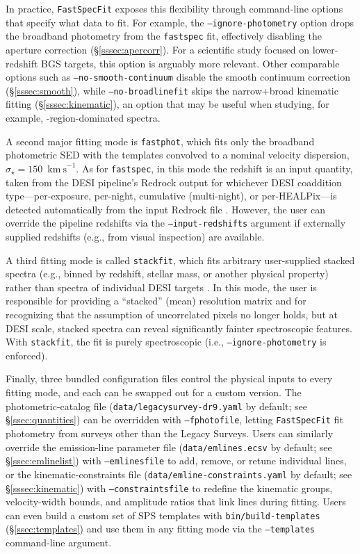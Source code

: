 \documentclass[modern,linenumbers]{aastex702}
\newcommand{\fastspecfit}{\texttt{FastSpecFit}}
\newcommand{\fastspec}{\texttt{fastspec}}
\newcommand{\fastphot}{\texttt{fastphot}}
\newcommand{\kms}{\ensuremath{\mathrm{km~s}^{-1}}}
\newcommand{\hii}{\ion{H}{2}}
\newcommand{\vdisp}{\ensuremath{\sigma_\star}}
\begin{document}
In practice, \fastspecfit{} exposes this flexibility through
command-line options that specify what data to fit. For example, the
\texttt{--ignore-photometry} option drops the broadband photometry
from the \fastspec{} fit, effectively disabling the aperture
correction (\S\ref{sssec:apercorr}). For a scientific study focused on
lower-redshift BGS targets, this option is arguably more relevant.
Other comparable options such as \texttt{--no-smooth-continuum}
disable the smooth continuum correction (\S\ref{sssec:smooth}), while
\texttt{--no-broadlinefit} skips the narrow+broad kinematic fitting
(\S\ref{sssec:kinematic}), an option that may be useful when studying,
for example, \hii-region-dominated spectra.

A second major fitting mode is \fastphot, which fits only the
broadband photometric SED with the templates convolved to a nominal
velocity dispersion, $\vdisp = 150$~\kms. As for \fastspec, in this
mode the redshift is an input quantity, taken from the DESI pipeline's
Redrock output for whichever DESI coaddition type---per-exposure,
per-night, cumulative (multi-night), or per-HEALPix---is detected
automatically from the input Redrock file \citep{guy23a,
  desi-collaboration26a}. However, the user can override the pipeline
redshifts via the \texttt{--input-redshifts} argument if externally
supplied redshifts (e.g., from visual inspection) are available.

A third fitting mode is called \texttt{stackfit}, which fits arbitrary
user-supplied stacked spectra (e.g., binned by redshift, stellar mass,
or another physical property) rather than spectra of individual DESI
targets \citep[e.g.,][]{scholte24a}. In this mode, the user is
responsible for providing a ``stacked'' (mean) resolution matrix and
for recognizing that the assumption of uncorrelated pixels no longer
holds, but at DESI scale, stacked spectra can reveal significantly
fainter spectroscopic features. With \texttt{stackfit}, the fit is
purely spectroscopic (i.e., \texttt{--ignore-photometry} is enforced).

Finally, three bundled configuration files control the physical inputs
to every fitting mode, and each can be swapped out for a custom
version. The photometric-catalog file
(\texttt{data/legacysurvey-dr9.yaml} by default; see
\S\ref{ssec:quantities}) can be overridden with \texttt{--fphotofile},
letting \fastspecfit{} fit photometry from surveys other than the
Legacy Surveys. Users can similarly override the emission-line
parameter file (\texttt{data/emlines.ecsv} by default; see
\S\ref{ssec:emlinelist}) with \texttt{--emlinesfile} to add, remove,
or retune individual lines, or the kinematic-constraints file
(\texttt{data/emline-constraints.yaml} by default; see
\S\ref{sssec:kinematic}) with \texttt{--constraintsfile} to redefine
the kinematic groups, velocity-width bounds, and amplitude ratios that
link lines during fitting. Users can even build a custom set of SPS
templates with \texttt{bin/build-templates} (\S\ref{ssec:templates})
and use them in any fitting mode via the \texttt{--templates}
command-line argument.
\end{document}
